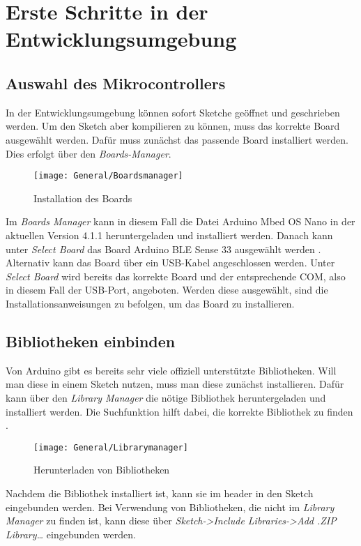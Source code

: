 \section{Erste Schritte in der Entwicklungsumgebung}
\subsection{Auswahl des Mikrocontrollers}
In der Entwicklungsumgebung können sofort Sketche geöffnet und geschrieben werden. Um den Sketch aber kompilieren zu können, muss das korrekte Board ausgewählt werden.
Dafür muss zunächst das passende Board installiert werden. 
 Dies erfolgt über den \textit{Boards-Manager}.
\begin{figure}[htb]
	\begin{center}
		\texttt{[image: General/Boardsmanager]}
		\caption{Installation des Boards} \label{Installation des Boards}
	\end{center}
\end{figure}
Im \textit{Boards Manager} kann in diesem Fall die Datei Arduino Mbed OS Nano in der aktuellen Version 4.1.1 heruntergeladen und installiert werden. Danach kann unter \textit{Select Board} das Board Arduino BLE Sense 33 ausgewählt werden \cite{Arduino.2024b}.
Alternativ kann das Board über ein USB-Kabel angeschlossen werden. Unter\textit{ Select Board} wird bereits das korrekte Board und der entsprechende COM, also in diesem Fall der USB-Port, angeboten. Werden diese ausgewählt, sind die Installationsanweisungen zu befolgen, um das Board zu installieren.

\subsection{Bibliotheken einbinden}
Von Arduino gibt es bereits sehr viele offiziell unterstützte Bibliotheken. Will man diese in einem Sketch nutzen, muss man diese zunächst installieren.
Dafür kann über den \textit{Library Manager} die nötige Bibliothek heruntergeladen und installiert werden. Die Suchfunktion hilft dabei, die korrekte Bibliothek zu finden \cite{Arduino.2024c}.
\begin{figure}
	\begin{center}
		\texttt{[image: General/Librarymanager]}
		\caption{Herunterladen von Bibliotheken} \label{Herunterladen von Bibliotheken}
	\end{center}
\end{figure}
Nachdem die Bibliothek installiert ist, kann sie im header in den Sketch eingebunden werden.
Bei Verwendung von Bibliotheken, die nicht im \textit{Library Manager} zu finden ist, kann diese über \textit{Sketch->Include Libraries->Add .ZIP Library…} eingebunden werden.

